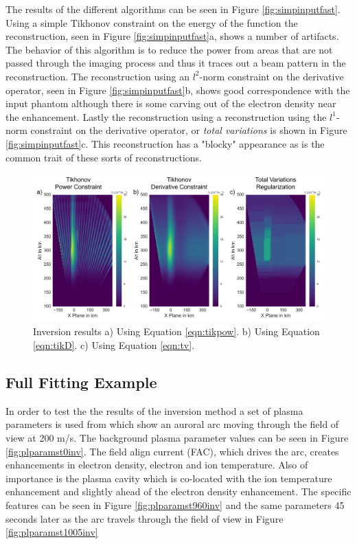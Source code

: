 The results of the different algorithms can be seen in Figure \ref{fig:simpinputfast}. Using a simple Tikhonov constraint on the energy of the function the reconstruction, seen in Figure \ref{fig:simpinputfast}a, shows a number of artifacts. The behavior of this algorithm is to reduce the power from areas that are not passed through the imaging process and thus it traces out a beam pattern in the reconstruction. The reconstruction using an $l^2$-norm constraint on the derivative operator, seen in Figure \ref{fig:simpinputfast}b, shows good correspondence with the input phantom although there is some carving out of the electron density near the enhancement. Lastly the reconstruction using a reconstruction using the $l^1$-norm constraint on the derivative operator, or \textit{total variations} is shown in Figure \ref{fig:simpinputfast}c. This reconstruction has a "blocky" appearance as is the common trait of these sorts of reconstructions.

\begin{figure}[!ht]
\centering
\includegraphics[width=6in]{Simpleinvertedfaster}
\caption{Inversion results a) Using Equation \ref{eqn:tikpow}.  b) Using Equation \ref{eqn:tikD}. c) Using Equation \ref{eqn:tv}.}
\label{fig:simpoutputfast}
\end{figure}

\subsection{Full Fitting Example}

In order to test the the results of the inversion method a set of plasma parameters is used from \citep{Perry:2015jf} which show an auroral arc moving through the field of view at 200 m/s. The background plasma parameter values can be seen in Figure \ref{fig:plparamst0inv}. The field align current (FAC), which drives the arc, creates enhancements in electron density, electron and ion temperature. Also of importance is the plasma cavity which is co-located with the ion temperature enhancement and slightly ahead of the electron density enhancement. The specific features can be seen in Figure \ref{fig:plparamst960inv} and the same parameters 45 seconds later as the arc travels through the field of view in Figure \ref{fig:plparamst1005inv}

